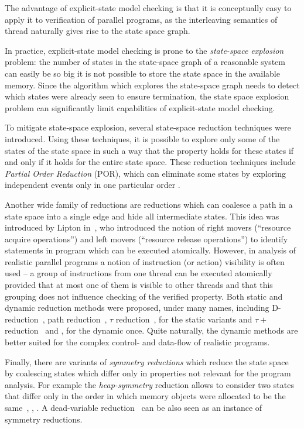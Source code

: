 The advantage of explicit-state model checking is that it is conceptually easy
to apply it to verification of parallel programs, as the interleaving semantics
of thread naturally gives rise to the state space graph. 

In practice, explicit-state model checking is prone to the \emph{state-space
explosion} problem: the number of states in the state-space graph of a
reasonable system can easily be so big it is not possible to store the state
space in the available memory.
Since the algorithm which explores the state-space graph needs to detect which
states were already seen to ensure termination, the state space explosion
problem can significantly limit capabilities of explicit-state model checking.

To mitigate state-space explosion, several state-space reduction techniques
were introduced.
Using these techniques, it is possible to explore only some of the states of
the state space in such a way that the property holds for these states if and
only if it holds for the entire state space.
These reduction techniques include \emph{Partial Order Reduction} (POR), which
can eliminate some states by exploring independent events only in one
particular order \cite{Pele1993,Godefroid1996partial, TODO}.

Another wide family of reductions are reductions which can coalesce a path in a
state space into a single edge and hide all intermediate states.
This idea was introduced by Lipton in~\cite{Lipton1975}, who introduced the
notion of right movers (``resource acquire operations'') and left movers
(``resource release operations'') to identify statements in program which can
be executed atomically.
However, in analysis of realistic parallel programs a notion of instruction (or
action) visibility is often used -- a group of instructions from one thread can
be executed atomically provided that at most one of them is visible to other
threads and that this grouping does not influence checking of the verified
property.
Both static and dynamic reduction methods were proposed, under many names,
including D-reduction~\cite{Lipton1975}, path reduction~\cite{Yorav2004}, $\tau$ reduction~\cite{BBR2012},  for the static variants and $\tau+$ reduction~\cite{RBB13} and \cite[Section 6]{RSCB2018},  for the dynamic once.
Quite naturally, the dynamic methods are better suited for the complex control-
and data-flow of realistic programs.

Finally, there are variants of \emph{symmetry reductions} which reduce the
state space by coalescing states which differ only in properties not relevant
for the program analysis.
For example the \emph{heap-symmetry} reduction allows to consider two states
that differ only in the order in which memory objects were allocated to be the
same~\cite{RBB13}, \cite[Chapter 6]{RSCB2018}, \cite{TODO}.
A dead-variable reduction~\cite{Yorav2004,Yorav2004:4,TODO} can be also seen as an instance of symmetry reductions.

